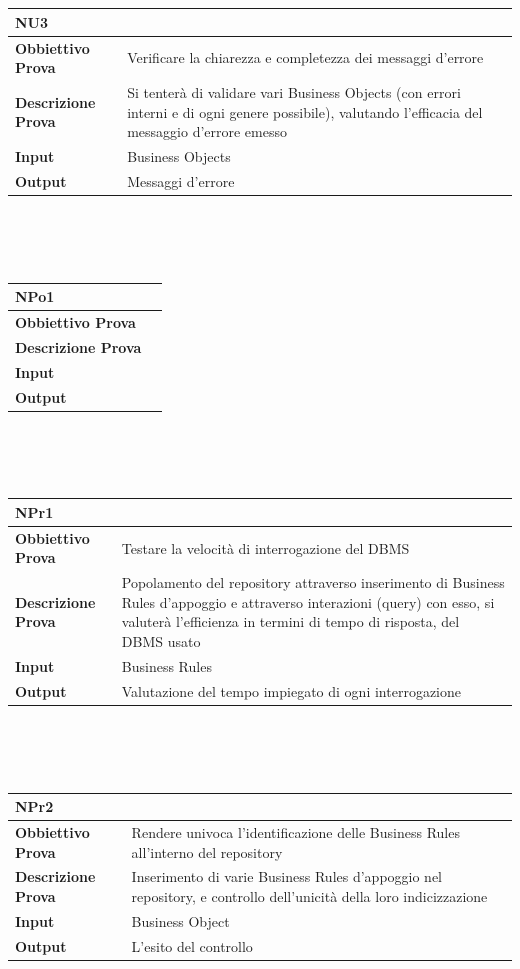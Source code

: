 \documentclass[11pt,titlepage,a4paper]{report}
\begin{document}
\\
\\
\begin{tabular}{||p{4.5cm}||p{7.5cm}||}
\hline
\textbf{\textsf{NU3}}& \\
\hline
{\textbf{Obbiettivo Prova}}& Verificare la chiarezza e completezza dei messaggi d'errore\\ \hline
{\textbf{Descrizione Prova}}& Si tenter\`a di validare vari Business Objects (con errori interni e di ogni genere possibile), valutando l'efficacia del messaggio d'errore emesso \\ \hline
{\textbf{Input}}&  Business Objects \\ \hline
{\textbf{Output}}& Messaggi d'errore\\ \hline
\end{tabular} \\
\\
\\
\begin{tabular}{||p{4.5cm}||p{7.5cm}||}
\hline
\textbf{\textsf{NPo1}}& \\
\hline
{\textbf{Obbiettivo Prova}}& \\ \hline
{\textbf{Descrizione Prova}}&  \\ \hline
{\textbf{Input}}&  \\ \hline
{\textbf{Output}}& \\ \hline
\end{tabular} \\
\\
\\
\begin{tabular}{||p{4.5cm}||p{7.5cm}||}
\hline
\textbf{\textsf{NPr1}}& \\
\hline
{\textbf{Obbiettivo Prova}}& Testare la velocit\`a di interrogazione del DBMS\\ \hline
{\textbf{Descrizione Prova}}& Popolamento del repository attraverso inserimento di Business Rules d'appoggio e attraverso interazioni (query) con esso, si valuter\`a l'efficienza in termini di tempo di risposta, del DBMS usato  \\ \hline
{\textbf{Input}}& Business Rules \\ \hline
{\textbf{Output}}& Valutazione del tempo impiegato di ogni interrogazione \\ \hline
\end{tabular} \\
\\
\\
\begin{tabular}{||p{4.5cm}||p{7.5cm}||}
\hline
\textbf{\textsf{NPr2}}& \\
\hline
{\textbf{Obbiettivo Prova}}& Rendere univoca l'identificazione delle Business Rules all'interno del repository \\ \hline
{\textbf{Descrizione Prova}}& Inserimento di varie Business Rules d'appoggio nel repository, e controllo dell'unicit\`a della loro indicizzazione \\ \hline
{\textbf{Input}}& Business Object \\ \hline
{\textbf{Output}}& L'esito del controllo\\ \hline
\end{tabular} \\
\end{document}
